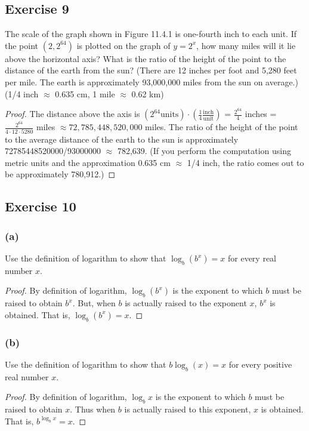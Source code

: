 \documentclass[14pt]{extarticle}
\newcommand{\dps}{\displaystyle}
\begin{document}
\subsection{Exercise 9}
The scale of the graph shown in Figure 11.4.1 is one-fourth inch to each unit. If the point \((2, 2^{64})\) is plotted on 
the graph of \(y = 2^x\), how many miles will it lie above the horizontal axis? What is the ratio of the height of the point 
to the distance of the earth from the sun? (There are 12 inches per foot and 5,280 feet per mile. The earth is 
approximately 93,000,000 miles from the sun on average.) (1/4 inch \(\approx\) 0.635 cm, 1 mile \(\approx\) 0.62 km)

\begin{proof}
The distance above the axis is \(\dps (2^{64} \text{units}) \cdot\left(\frac{1}{4}\frac{\text{inch}}{\text{unit}}\right)\)
= \(\dps \frac{2^{64}}{4}\) inches = \(\dps \frac{2^{64}}{4 \cdot 12 \cdot 5280}\) miles \(\approx 72,785,448,520,000\)
miles. The ratio of the height of the point to the average distance of the earth to the sun is approximately 
72785448520000/93000000 \(\approx\) 782,639. (If you perform the computation using metric units and the approximation 0.635 
cm \(\approx\) 1/4 inch, the ratio comes out to be approximately 780,912.)
\end{proof}

\subsection{Exercise 10}
\subsubsection{(a)}
Use the definition of logarithm to show that \(\log_b(b^x) = x\) for every real number \(x\).

\begin{proof}
By definition of logarithm,  \(\log_b (b^x)\) is the exponent to which \(b\) must be raised to obtain \(b^x\). But, when 
\(b\) is actually raised to the exponent \(x\), \(b^x\) is obtained. That is, \(\log_b (b^x) = x\).
\end{proof}

\subsubsection{(b)}
Use the definition of logarithm to show that \(b\log_b(x) = x\) for every positive real number \(x\).

\begin{proof}
By definition of logarithm,  \(\log_b x\) is the exponent to which \(b\) must be raised to obtain \(x\). Thus when \(b\) is 
actually raised to this exponent, \(x\) is obtained. That is, \(b^{\log_b x} = x\).
\end{proof}
\end{document}
